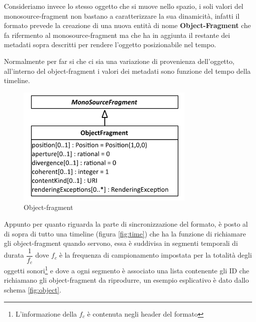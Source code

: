 \documentclass[12pt,a4paper]{report}
\begin{document}
Consideriamo invece lo stesso oggetto che si muove nello spazio, i soli valori del monosource-fragment non bastano a caratterizzare la sua dinamicità, infatti il formato prevede la creazione di una nuova entità di nome \textbf{Object-Fragment} che fa rifermento al monosource-fragment ma che ha in aggiunta il restante dei metadati sopra descritti per rendere l'oggetto posizionabile nel tempo.

Normalmente per far si che ci sia una variazione di provenienza dell'oggetto, all'interno del object-fragment i valori dei metadati sono funzione del tempo della timeline.

\begin{figure}[htbp]
	\centering
	\includegraphics[scale=0.50]{figures/object-fragment.png}
	\caption {Object-fragment}
	\label{fig:of}
	\end{figure}
	 
Appunto per quanto riguarda la parte di sincronizzazione del formato, è posto al di sopra di tutto una timeline (figura \ref{fig:time}) che ha la funzione di richiamare gli object-fragment quando servono, essa è suddivisa in segmenti temporali di durata $\dfrac{1}{f_c}$ dove $f_c$ è la frequenza di campionamento impostata per la totalità degli oggetti sonori\footnote{L'informazione della $f_c$ è contenuta negli header del formato} e dove a ogni segmento è associato una lista contenente gli ID che richiamano gli object-fragment da riprodurre, un esempio esplicativo è dato dallo schema \ref{fig:object}.
\end{document}
